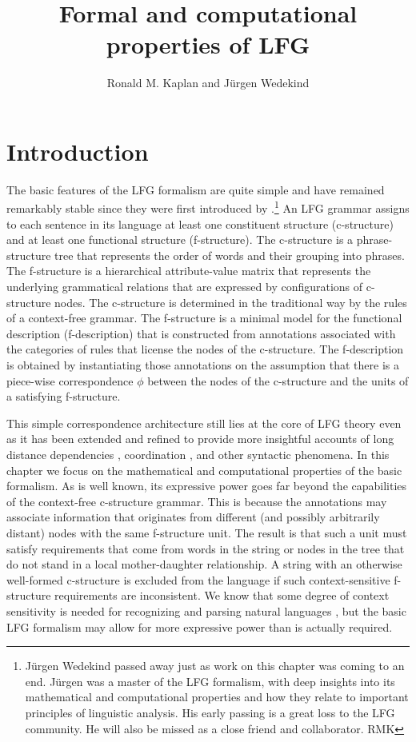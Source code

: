 \documentclass[output=paper,hidelinks]{langscibook}
\title{Formal and computational properties of LFG}
\author{Ronald M. Kaplan\affiliation{Stanford University} and Jürgen Wedekind\affiliation{University of Copenhagen}}
\begin{document}
\maketitle
\label{chap:Computational}


\clearpage
\section{Introduction}

The basic features of the LFG formalism are quite simple and have remained remarkably stable since they were first introduced by \citet{kaplanbresnan82}.\footnote{Jürgen Wedekind passed away just as work on this chapter was coming to an end.  Jürgen was a master of the LFG formalism, with deep insights into its mathematical and computational properties and how they relate to important principles of linguistic analysis. His early passing is a great loss to the LFG community. He will also be missed as a close friend and collaborator. RMK} An LFG grammar assigns to each sentence in its language at least one constituent structure (c-structure) and at least one functional structure (f-structure).  The c-structure is a phrase-structure tree that represents the order of words and their grouping into phrases.  The f-structure is a hierarchical attribute-value matrix that represents the underlying grammatical relations that are expressed by configurations of c-structure nodes.  The c-structure is determined in the traditional way by the rules of a context-free grammar. The f-structure is a minimal model for  the functional description (f-description) that is constructed from annotations associated with the categories of  rules that license the nodes of the c-structure. The f-description is obtained by instantiating those annotations on the assumption that there is a piece-wise correspondence $\phi$ between the nodes of the c-structure and the units of a satisfying f-structure.
\renewcommand*{\thefootnote}{\arabic{footnote}}
\setcounter{footnote}{0}

This simple correspondence architecture still lies at the core of LFG theory even as it has been extended and refined to provide more insightful accounts of long distance dependencies \citep{kaplzaen89}, coordination \citep{KaplanMaxwell1988:Coord}, and other syntactic phenomena. In this chapter we focus on the mathematical and computational properties of the basic formalism.  As is well known, its expressive power goes far beyond the capabilities of the context-free c-structure grammar. This is because the annotations may associate information that originates from different (and possibly arbitrarily distant) nodes with the same f-structure unit.  The result is that such a unit must satisfy requirements that  come from words in the string or nodes in the tree that do not stand in a local mother-daughter relationship.  A string with an otherwise well-formed c-structure is excluded from the language if such context-sensitive f-structure requirements are inconsistent.  We know that some degree of context sensitivity is needed for recognizing and parsing natural languages \citep{BKPZ:Dutch, CulyBambara1985, Shieber1985}, but the basic LFG formalism may allow for more expressive power than is actually required.
\end{document}
